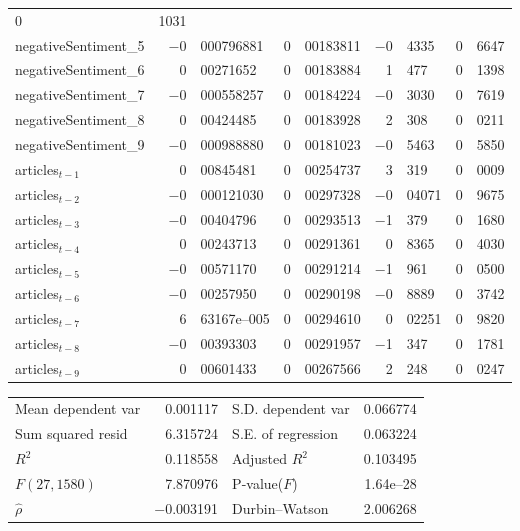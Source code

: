 \begin{center}
\begin{longtable}{lr@{.}lr@{.}lr@{.}lr@{.}l}
        0&1031 \\
negativeSentiment\_5 &
    $-$0&000796881 &
    0&00183811 &
        $-$0&4335 &
        0&6647 \\
negativeSentiment\_6 &
    0&00271652 &
    0&00183884 &
        1&477 &
        0&1398 \\
negativeSentiment\_7 &
    $-$0&000558257 &
    0&00184224 &
        $-$0&3030 &
        0&7619 \\
negativeSentiment\_8 &
    0&00424485 &
    0&00183928 &
        2&308 &
        0&0211 \\
negativeSentiment\_9 &
    $-$0&000988880 &
    0&00181023 &
        $-$0&5463 &
        0&5850 \\
articles$_{t-1}$ &
    0&00845481 &
    0&00254737 &
        3&319 &
        0&0009 \\
articles$_{t-2}$ &
    $-$0&000121030 &
    0&00297328 &
        $-$0&04071 &
        0&9675 \\
articles$_{t-3}$ &
    $-$0&00404796 &
    0&00293513 &
        $-$1&379 &
        0&1680 \\
articles$_{t-4}$ &
    0&00243713 &
    0&00291361 &
        0&8365 &
        0&4030 \\
articles$_{t-5}$ &
    $-$0&00571170 &
    0&00291214 &
        $-$1&961 &
        0&0500 \\
articles$_{t-6}$ &
    $-$0&00257950 &
    0&00290198 &
        $-$0&8889 &
        0&3742 \\
articles$_{t-7}$ &
    6&63167\textrm{e--005} &
    0&00294610 &
        0&02251 &
        0&9820 \\
articles$_{t-8}$ &
    $-$0&00393303 &
    0&00291957 &
        $-$1&347 &
        0&1781 \\
articles$_{t-9}$ &
    0&00601433 &
    0&00267566 &
        2&248 &
        0&0247 \\
\end{longtable}

\begin{tabular}{lrlr}
Mean dependent var &  0.001117 & S.D. dependent var &  0.066774 \\
Sum squared resid &  6.315724 & S.E. of regression &  0.063224 \\
$R^2$ &  0.118558 & Adjusted $R^2$ &  0.103495 \\
$F(27, 1580)$ &  7.870976 & P-value($F$) &  1.64\textrm{e--28} \\
$\hat{\rho}$ & $-$0.003191 & Durbin--Watson &  2.006268 \\
\end{tabular}

\end{center}

